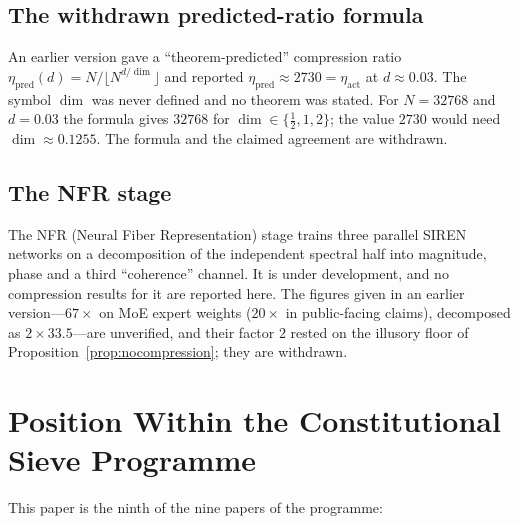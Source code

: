 \documentclass[12pt]{article}
\theoremstyle{definition}
\newcommand{\etapred}{\eta_{\mathrm{pred}}}
\newcommand{\etaact}{\eta_{\mathrm{act}}}
\begin{document}
\subsection{The withdrawn predicted-ratio formula}

An earlier version gave a ``theorem-predicted'' compression ratio
$\etapred(d) = N/\lfloor N^{d/\dim} \rfloor$ and reported
$\etapred \approx 2730 = \etaact$ at $d \approx 0.03$.  The symbol
$\dim$ was never defined and no theorem was stated.  For $N = 32768$ and
$d = 0.03$ the formula gives $32768$ for $\dim \in \{\tfrac{1}{2}, 1, 2\}$;
the value $2730$ would need $\dim \approx 0.1255$.  The formula and the
claimed agreement are withdrawn.

\subsection{The NFR stage}

The NFR (Neural Fiber Representation) stage trains three parallel SIREN
networks \cite{Sitzmann2020} on a decomposition of the independent
spectral half into magnitude, phase and a third ``coherence'' channel.
It is under development, and no compression results for it are reported
here.  The figures given in an earlier version---$67\times$ on MoE expert
weights ($20\times$ in public-facing claims), decomposed as
$2 \times 33.5$---are unverified, and their factor $2$ rested on the
illusory floor of Proposition~\ref{prop:nocompression}; they are
withdrawn.

\section{Position Within the Constitutional Sieve Programme}
\label{sec:sieve}

This paper is the ninth of the nine papers of the programme:
\end{document}
